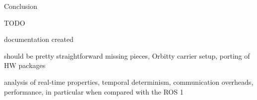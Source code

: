 \chap[conclusion] Conclusion

TODO

documentation created

should be pretty straightforward missing pieces, Orbitty carrier setup, porting of HW packages

analysis of real-time properties, temporal determinism, communication overheads, performance, in particular
when compared with the ROS 1
